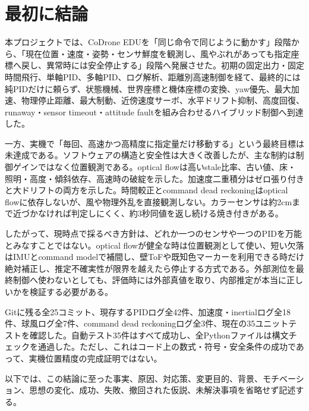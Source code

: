 \documentclass[10pt,a4paper,openany]{ltjsbook}
\begin{document}
\chapter*{最初に結論}
本プロジェクトでは、CoDrone EDUを「同じ命令で同じように動かす」段階から、「現在位置・速度・姿勢・センサ鮮度を観測し、風やぶれがあっても指定座標へ戻し、異常時には安全停止する」段階へ発展させた。初期の固定出力・固定時間飛行、単軸PID、多軸PID、ログ解析、距離別高速制御を経て、最終的には純PIDだけに頼らず、状態機械、世界座標と機体座標の変換、yaw優先、最大加速、物理停止距離、最大制動、近傍速度サーボ、水平ドリフト抑制、高度回復、runaway・sensor timeout・attitude faultを組み合わせるハイブリッド制御へ到達した。\par
一方、実機で「毎回、高速かつ高精度に指定量だけ移動する」という最終目標は未達成である。ソフトウェアの構造と安全性は大きく改善したが、主な制約は制御ゲインではなく位置観測である。optical flowは高いstale比率、古い値、床・照明・高度・傾斜依存、高速時の破綻を示した。加速度二重積分はゼロ張り付きと大ドリフトの両方を示した。時間較正とcommand dead reckoningはoptical flowに依存しないが、風や物理外乱を直接観測しない。カラーセンサは約2cmまで近づかなければ判定しにくく、約3秒同値を返し続ける焼き付きがある。\par
したがって、現時点で採るべき方針は、どれか一つのセンサや一つのPIDを万能とみなすことではない。optical flowが健全な時は位置観測として使い、短い欠落はIMUとcommand modelで補間し、壁ToFや既知色マーカーを利用できる時だけ絶対補正し、推定不確実性が限界を越えたら停止する方式である。外部測位を最終制御へ使わないとしても、評価時には外部真値を取り、内部推定が本当に正しいかを検証する必要がある。\par
Gitに残る全25コミット、現存するPIDログ全42件、加速度・inertialログ全18件、球風ログ全7件、command dead reckoningログ全3件、現在の35ユニットテストを確認した。自動テスト35件はすべて成功し、全Pythonファイルは構文チェックを通過した。ただし、これはコード上の数式・符号・安全条件の成功であって、実機位置精度の完成証明ではない。\par
以下では、この結論に至った事実、原因、対応策、変更目的、背景、モチベーション、思想の変化、成功、失敗、撤回された仮説、未解決事項を省略せず記述する。\par
\vspace{0.3em}{\noindent\color{ReportLight}\rule{\linewidth}{0.8pt}}\vspace{0.3em}
\end{document}

